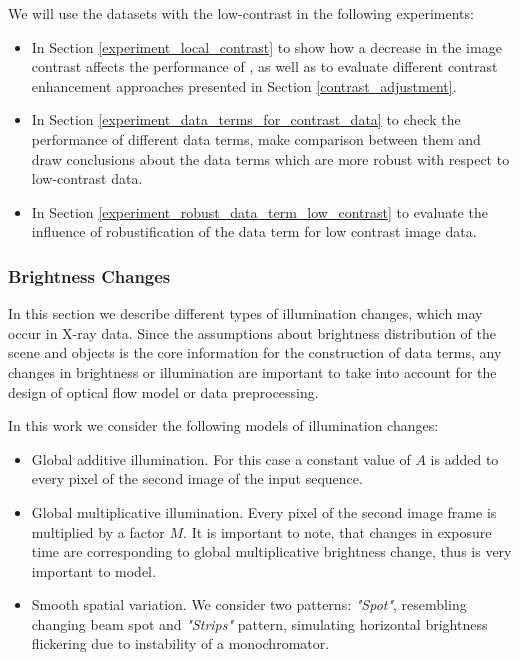 We will use the datasets with the low-contrast in the following experiments:
\begin{itemize}

 \item In Section \ref{experiment_local_contrast} to show how a decrease in the image contrast affects the performance of \opticalflow, as well as to evaluate different contrast enhancement  approaches presented in Section \ref{contrast_adjustment}.
 
  \item In Section \ref{experiment_data_terms_for_contrast_data} to check the performance of different data terms, make comparison between them and draw conclusions about the data terms which are more robust with respect to low-contrast data.

  \item In Section \ref{experiment_robust_data_term_low_contrast} to evaluate the influence of robustification of the data term for low contrast image data.
 
\end{itemize}



\subsubsection{Brightness Changes}
\label{modeling_brigntenss}

In this section we describe different types of illumination changes, which may occur in X-ray data. Since the assumptions about brightness distribution of the scene and objects is the core information for the construction of data terms, any changes in brightness or illumination are important to take into account for the design of optical flow model or data preprocessing.

In this work we consider the following models of illumination changes:
\begin{itemize}
  \item Global additive illumination. For this case a constant value of $A$ is added to every pixel of the second image of the input sequence.
  \item Global multiplicative illumination. Every pixel of the second image frame is multiplied by a factor $M$. It is important to note, that changes in exposure time are corresponding to global multiplicative brightness change, thus is very important to model.
  \item Smooth spatial variation. We consider two patterns:  \textit{"Spot"}, resembling changing beam spot and \textit{"Strips"} pattern, simulating horizontal brightness flickering due to instability of a monochromator.
\end{itemize}

